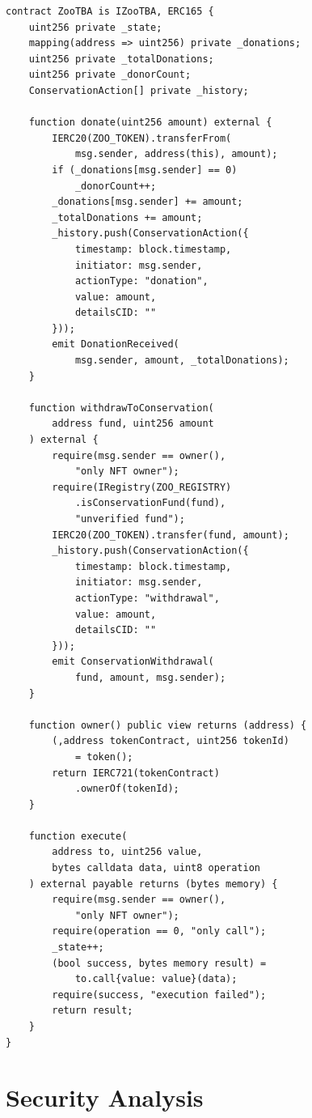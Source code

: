 \documentclass[11pt,letterpaper]{article}
\begin{document}
\begin{lstlisting}[language=Solidity,caption=ZooTBA reference implementation (simplified)]
contract ZooTBA is IZooTBA, ERC165 {
    uint256 private _state;
    mapping(address => uint256) private _donations;
    uint256 private _totalDonations;
    uint256 private _donorCount;
    ConservationAction[] private _history;

    function donate(uint256 amount) external {
        IERC20(ZOO_TOKEN).transferFrom(
            msg.sender, address(this), amount);
        if (_donations[msg.sender] == 0)
            _donorCount++;
        _donations[msg.sender] += amount;
        _totalDonations += amount;
        _history.push(ConservationAction({
            timestamp: block.timestamp,
            initiator: msg.sender,
            actionType: "donation",
            value: amount,
            detailsCID: ""
        }));
        emit DonationReceived(
            msg.sender, amount, _totalDonations);
    }

    function withdrawToConservation(
        address fund, uint256 amount
    ) external {
        require(msg.sender == owner(),
            "only NFT owner");
        require(IRegistry(ZOO_REGISTRY)
            .isConservationFund(fund),
            "unverified fund");
        IERC20(ZOO_TOKEN).transfer(fund, amount);
        _history.push(ConservationAction({
            timestamp: block.timestamp,
            initiator: msg.sender,
            actionType: "withdrawal",
            value: amount,
            detailsCID: ""
        }));
        emit ConservationWithdrawal(
            fund, amount, msg.sender);
    }

    function owner() public view returns (address) {
        (,address tokenContract, uint256 tokenId)
            = token();
        return IERC721(tokenContract)
            .ownerOf(tokenId);
    }

    function execute(
        address to, uint256 value,
        bytes calldata data, uint8 operation
    ) external payable returns (bytes memory) {
        require(msg.sender == owner(),
            "only NFT owner");
        require(operation == 0, "only call");
        _state++;
        (bool success, bytes memory result) =
            to.call{value: value}(data);
        require(success, "execution failed");
        return result;
    }
}
\end{lstlisting}

\section{Security Analysis}
\label{sec:security}
\end{document}
